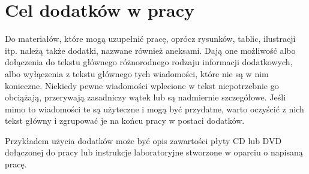 \chapter{Cel dodatków w pracy}

Do materiałów, które mogą uzupełnić pracę, oprócz rysunków, tablic, ilustracji itp. należą także dodatki, nazwane również aneksami. Dają one możliwość albo dołączenia do tekstu głównego różnorodnego rodzaju informacji dodatkowych, albo wyłączenia z tekstu głównego tych wiadomości, które nie są w nim konieczne. Niekiedy pewne wiadomości wplecione w tekst niepotrzebnie go obciążają, przerywają zasadniczy wątek lub są nadmiernie szczegółowe. Jeśli mimo to wiadomości te są użyteczne i mogą być przydatne, warto oczyścić z nich tekst główny i zgrupować je na końcu pracy w postaci dodatków.


Przykładem użycia dodatków może być opis zawartości płyty CD lub DVD dołączonej do pracy lub instrukcje laboratoryjne stworzone w oparciu o napisaną pracę.

